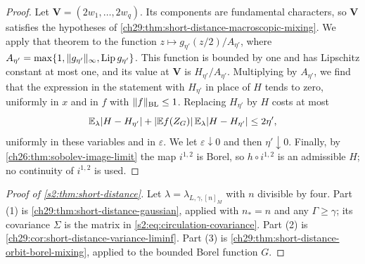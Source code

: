 \begin{proof}
Let $\mathbf V=(2w_1,\dots,2w_q)$. Its components are fundamental characters, so $\mathbf V$ satisfies the hypotheses of \cref{ch29:thm:short-distance-macroscopic-mixing}. We apply that theorem to the function $z\mapsto g_{\eta'}(z/2)/A_{\eta'}$, where $A_{\eta'}=\max\{1,\|g_{\eta'}\|_\infty,\operatorname{Lip} g_{\eta'}\}$. This function is bounded by one and has Lipschitz constant at most one, and its value at $\mathbf V$ is $H_{\eta'}/A_{\eta'}$. Multiplying by $A_{\eta'}$, we find that the expression in the statement with $H_{\eta'}$ in place of $H$ tends to zero, uniformly in $x$ and in $f$ with $\|f\|_{\rm BL}\le1$. Replacing $H_{\eta'}$ by $H$ costs at most
\[
 \mathbb E_\lambda|H-H_{\eta'}|+|\mathbb E f(Z_G)|\,\mathbb E_\lambda|H-H_{\eta'}|\le2\eta',
\]
uniformly in these variables and in $\varepsilon$. We let $\varepsilon\downarrow0$ and then $\eta'\downarrow0$. Finally, by \cref{ch26:thm:sobolev-image-limit} the map $i^{1,2}$ is Borel, so $h\circ i^{1,2}$ is an admissible $H$; no continuity of $i^{1,2}$ is used.
\end{proof}

\begin{proof}[Proof of \cref{s2:thm:short-distance}]
Let $\lambda=\lambda_{L,\gamma,[n]_M}$ with $n$ divisible by four. Part (1) is \cref{ch29:thm:short-distance-gaussian}, applied with $n_*=n$ and any $\Gamma\ge\gamma$; its covariance $\Sigma$ is the matrix in \eqref{s2:eq:circulation-covariance}. Part (2) is \cref{ch29:cor:short-distance-variance-liminf}. Part (3) is \cref{ch29:thm:short-distance-orbit-borel-mixing}, applied to the bounded Borel function $G$.
\end{proof}
